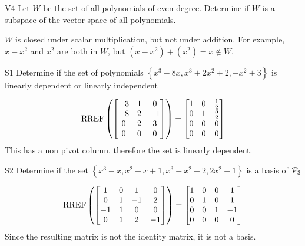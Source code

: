 \documentclass{sbgLAexam}
\begin{document}
\begin{problem}{V4} Let $W$ be the set of all polynomials of even degree.  Determine if $W$ is a subspace of the vector space of all polynomials.
\end{problem}
\begin{solution}
$W$ is closed under scalar multiplication, but not under addition.  For example, $x-x^2$ and $x^2$ are both in $W$, but $(x-x^2)+(x^2)=x \notin W$.
\end{solution}


\begin{extract}\newpage\end{extract}
\begin{problem}{S1}
Determine if the set of polynomials $\left\{ x^3-8x, x^3+2x^2+2, -x^2+3\right\}$ is  linearly dependent or linearly independent
\end{problem}
\begin{solution}
$$\RREF\left( \begin{bmatrix}-3 & 1 & 0 \\ -8 & 2 & -1 \\ 0 & 2 & 3 \\ 0 & 0 & 0\end{bmatrix}\right) = \begin{bmatrix} 1 & 0 & \frac{1}{2} \\ 0 & 1 & \frac{3}{2} \\ 0 & 0 & 0 \\ 0 & 0 & 0 \end{bmatrix}$$ 
This has a non pivot column, therefore the set is linearly dependent.
\end{solution}


\begin{problem}{S2}
Determine if the set $\left\{ x^3-x, x^2+x+1, x^3-x^2+2, 2x^2-1 \right\}$ is a basis of $\P_3$
\end{problem}
\begin{solution}
$$\RREF\left(\begin{bmatrix} 1 & 0 & 1 & 0 \\ 0 & 1 & -1 & 2 \\ -1 & 1 & 0 & 0 \\ 0 & 1 & 2 & -1 \end{bmatrix} \right)= \begin{bmatrix} 1 & 0 &0 & 1 \\ 0 & 1 & 0 & 1 \\ 0 & 0 & 1 & -1 \\ 0 & 0 & 0 & 0 \end{bmatrix}$$
Since the resulting matrix is not the identity matrix, it is not a basis.
\end{solution}
\end{document}
